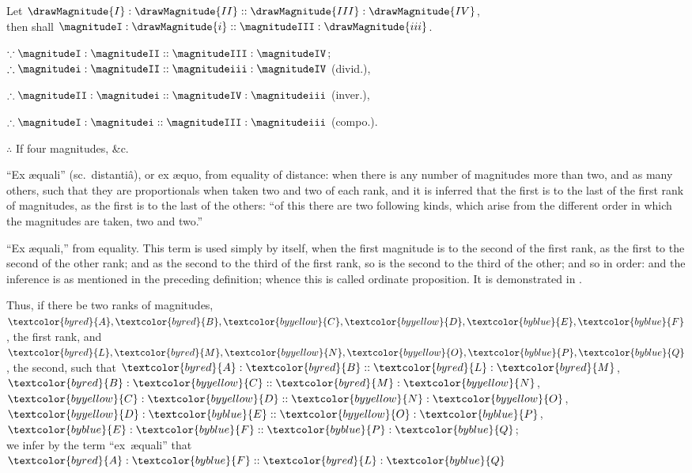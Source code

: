 \documentclass[booklanguage=english]{byrnebook}
\begin{document}
\begin{center}
Let $\drawMagnitude{I} : \drawMagnitude{II} :: \drawMagnitude{III} : \drawMagnitude{IV}$,\\
then shall $\magnitudeI : \drawMagnitude{i} :: \magnitudeIII : \drawMagnitude{iii}$.

$\because \magnitudeI : \magnitudeII :: \magnitudeIII : \magnitudeIV$;\\ %
$\therefore \magnitudei : \magnitudeII :: \magnitudeiii : \magnitudeIV$ (divid.), %

$\therefore \magnitudeII : \magnitudei :: \magnitudeIV : \magnitudeiii$ (inver.),

$\therefore \magnitudeI : \magnitudei :: \magnitudeIII : \magnitudeiii$ (compo.).

$\therefore$ If four magnitudes, \&c.
\end{center}

\label{def:V.XVIII} 
\enquote{Ex \ae quali} (sc.\ distantiâ), or ex \ae quo, from equality of distance: when there is any number of magnitudes more than two, and as many others, such that they are proportionals when taken two and two of each rank, and it is inferred that the first is to the last of the first rank of magnitudes, as the first is to the last of the others: \enquote{of this there are two following kinds, which arise from the different order in which the magnitudes are taken, two and two.}

\vfill\pagebreak

\label{def:V.XIX} 
\def\varA{\textcolor{byred}{A}}
\def\varB{\textcolor{byred}{B}}
\def\varC{\textcolor{byyellow}{C}}
\def\varD{\textcolor{byyellow}{D}}
\def\varE{\textcolor{byblue}{E}}
\def\varF{\textcolor{byblue}{F}}
\def\varL{\textcolor{byred}{L}}
\def\varM{\textcolor{byred}{M}}
\def\varN{\textcolor{byyellow}{N}}
\def\varO{\textcolor{byyellow}{O}}
\def\varP{\textcolor{byblue}{P}}
\def\varQ{\textcolor{byblue}{Q}}
\enquote{Ex \ae quali,} from equality. This term is used simply by itself, when the first magnitude is to the second of the first rank, as the first to the second of the other rank; and as the second to the third of the first rank, so is the second to the third of the other; and so in order: and the inference is as mentioned in the preceding definition; whence this is called ordinate proposition. It is demonstrated in .

\begin{center}
Thus, if there be two ranks of magnitudes,\\
$\varA, \varB, \varC, \varD, \varE, \varF$, the first rank,
and $\varL, \varM, \varN, \varO, \varP, \varQ$, the second,
such that $\varA : \varB :: \varL : \varM$, $\varB : \varC :: \varM : \varN$, $\varC : \varD :: \varN : \varO$, $\varD : \varE :: \varO : \varP$, $\varE : \varF :: \varP : \varQ$;\\
we infer by the term \enquote{ex~\ae quali} that $\varA : \varF :: \varL : \varQ$
\end{center}
\end{document}
